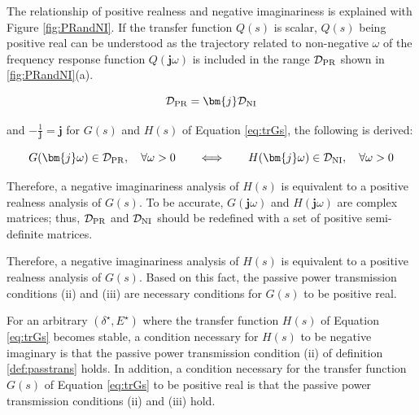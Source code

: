 \documentclass[graybox, envcountchap]{svmult}
\begin{document}
The relationship of positive realness and negative imaginariness is explained
with Figure \ref{fig:PRandNI}. If the transfer function $Q(s)$ is scalar,
$Q(s)$ being positive real can be understood as the trajectory related to
non-negative $\omega$ of the frequency response function $Q(\bm{j} \omega)$ is
included in the range $\mathcal{D}_{\rm PR}$ shown in \ref{fig:PRandNI}(a).

\[
  \mathcal{D}_{\rm PR} = \bm{j} \mathcal{D}_{\rm NI}
\]

and $-\tfrac{1}{\bm{j}}=\bm{j}$ for $G(s)$ and $H(s)$ of Equation \ref{eq:trGs},
the following is derived:

\[
  G(\bm{j} \omega) \in \mathcal{D}_{\rm PR}, 
  \quad \forall \omega >0
  \qquad
  \Longleftrightarrow
  \qquad
  H(\bm{j} \omega) \in \mathcal{D}_{\rm NI} ,
  \quad \forall \omega >0
\]

Therefore, a negative imaginariness analysis of $H(s)$ is equivalent to a
positive realness analysis of $G(s)$. To be accurate, $G(\bm{j} \omega)$ and
$H(\bm{j} \omega)$ are complex matrices; thus, $\mathcal{D}_{\rm PR}$ and
$\mathcal{D}_{\rm NI}$ should be redefined with a set of positive semi-definite
matrices.

Therefore, a negative imaginariness analysis of $H(s)$ is equivalent to a
positive realness analysis of $G(s)$. Based on this fact, the passive power
transmission conditions (ii) and (iii) are necessary conditions for $G(s)$ to be
positive real.

\begin{theorem}
\label{thm:EdynNI}
For an arbitrary $(\delta^{\star},E^{\star})$ where the transfer function $H(s)$ of Equation \ref{eq:trGs} becomes stable, a condition necessary for $H(s)$ to be negative imaginary is that the passive power transmission condition (ii) of definition \ref{def:passtrans} holds.
In addition, a condition necessary for the transfer function $G(s)$ of Equation \ref{eq:trGs} to be positive real is that the passive power transmission conditions (ii) and (iii) hold.
\end{theorem}
\end{document}
